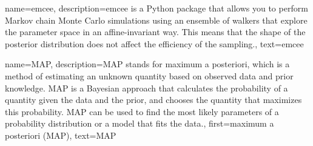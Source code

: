 {%
  name={emcee},%
  description={emcee is a Python package that allows you to perform Markov chain Monte Carlo simulations using an ensemble of walkers that explore the parameter space in an affine-invariant way. This means that the shape of the posterior distribution does not affect the efficiency of the sampling.},%
  text={emcee}%
}

{%
  name={MAP},%
  description={MAP stands for maximum a posteriori, which is a method of estimating an unknown quantity based on observed data and prior knowledge. MAP is a Bayesian approach that calculates the probability of a quantity given the data and the prior, and chooses the quantity that maximizes this probability. MAP can be used to find the most likely parameters of a probability distribution or a model that fits the data.},%
  first={maximum a posteriori (MAP)},%
  text={MAP}%
}




